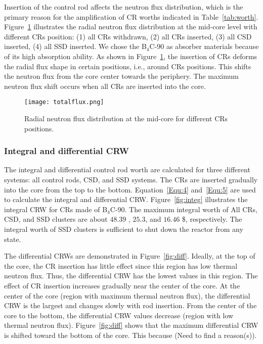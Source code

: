 Insertion of the control rod affects the neutron flux distribution, which is 
the primary reason for the amplification of CR worths indicated in 
Table~\ref{tab:worth}. Figure~\ref{fig:totalflux} illustrates the radial 
neutron flux distribution at the mid-core level with different CRs position: 
(1) all CRs withdrawn, (2) all CRs inserted, (3) all CSD inserted, (4) all SSD 
inserted. We chose the B$_4$C-90 as absorber materials because of its high 
absorption ability. As shown in Figure~\ref{fig:totalflux}, the insertion of 
CRs deforms the radial flux shape in certain positions, i.e., around CRs 
positions. This shifts the neutron flux from the core center towards the 
periphery. The maximum neutron flux shift occurs when all CRs are inserted 
into the core.
\begin{figure}[!ht]
	\centering
	\texttt{[image: totalflux.png]}
	\vspace{-0.5in}
	\caption{Radial neutron flux distribution at the mid-core for different 
	CRs positions.} 
	\label{fig:totalflux}
\end{figure}
 

\subsubsection{Integral and differential CRW}

The integral and differential control rod worth are calculated for three 
different systems: all control rods, CSD, and SSD systems. The CRs are 
inserted gradually into the core from the top to the bottom. 
Equation~\ref{Equ:4} and~\ref{Equ:5} are used to calculate the integral and 
differential CRW. Figure~\ref{fig:integ} illustrates the integral CRW for CRs 
made of B$_4$C-90. The maximum integral worth of All CRs, CSD, and SSD 
clusters are about $48.39$ , $25.3$, and $16.46$ \$, respectively. The 
integral worth of SSD clusters is sufficient to shut down the reactor from any 
state.

The differential CRWs are demonstrated in Figure~\ref{fig:diff}. Ideally, at the top of the core, the CR insertion has little effect since this region has low thermal neutron flux. Thus, the differential CRW has the lowest values in this region. The effect of CR insertion increases gradually near the center of the core. At the center of the core (region with maximum thermal neutron flux), the differential CRW is the largest and changes slowly with rod insertion. From the center of the core to the bottom, the differential CRW values decrease (region with low thermal neutron flux). Figure~\ref{fig:diff} shows that the maximum differential CRW  is shifted toward the bottom of the core. This because (Need to find a reason(s)).

